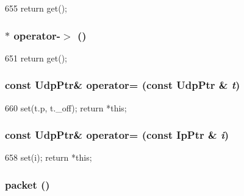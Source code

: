 \begin{DoxyCode}
655 { return get(); }
\end{DoxyCode}
\hypertarget{classNet_1_1UdpPtr_a04f04b83c0b726766c5767db893bf65e}{
\subsubsection[{operator-\/$>$}]{$\ast$ operator-\/$>$ ()}}
\label{classNet_1_1UdpPtr_a04f04b83c0b726766c5767db893bf65e}



\begin{DoxyCode}
651 { return get(); }
\end{DoxyCode}
\hypertarget{classNet_1_1UdpPtr_abe501d76a9a5d61533a88257e47ce552}{
\subsubsection[{operator=}]{\setlength{\rightskip}{0pt plus 5cm}const {\bf UdpPtr}\& operator= (const {\bf UdpPtr} \& {\em t})}}
\label{classNet_1_1UdpPtr_abe501d76a9a5d61533a88257e47ce552}



\begin{DoxyCode}
660     { set(t.p, t._off); return *this; }
\end{DoxyCode}
\hypertarget{classNet_1_1UdpPtr_a86eade3b854c44d7f65c9775bc391295}{
\subsubsection[{operator=}]{\setlength{\rightskip}{0pt plus 5cm}const {\bf UdpPtr}\& operator= (const {\bf IpPtr} \& {\em i})}}
\label{classNet_1_1UdpPtr_a86eade3b854c44d7f65c9775bc391295}



\begin{DoxyCode}
658 { set(i); return *this; }
\end{DoxyCode}
\hypertarget{classNet_1_1UdpPtr_a549ac5c293e8047f1be38ca356e160da}{
\subsubsection[{packet}]{ packet ()}}
\label{classNet_1_1UdpPtr_a549ac5c293e8047f1be38ca356e160da}



